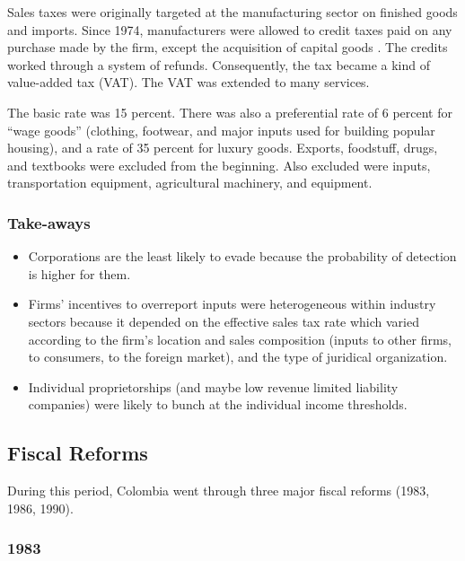 \documentclass[
  12pt]{article}
\providecommand{\tightlist}{%
  \setlength{\itemsep}{0pt}\setlength{\parskip}{0pt}}\usepackage{longtable,booktabs,array}
\begin{document}
Sales taxes were originally targeted at the manufacturing sector on
finished goods and imports. Since 1974, manufacturers were allowed to
credit taxes paid on any purchase made by the firm, except the
acquisition of capital goods \citep{Perry1990}. The credits worked
through a system of refunds. Consequently, the tax became a kind of
value-added tax (VAT). The VAT was extended to many services.

The basic rate was 15 percent. There was also a preferential rate of 6
percent for ``wage goods'' (clothing, footwear, and major inputs used
for building popular housing), and a rate of 35 percent for luxury
goods. Exports, foodstuff, drugs, and textbooks were excluded from the
beginning. Also excluded were inputs, transportation equipment,
agricultural machinery, and equipment.

\hypertarget{take-aways}{%
\subsubsection{Take-aways}\label{take-aways}}

\begin{itemize}
\tightlist
\item
  Corporations are the least likely to evade because the probability of
  detection is higher for them.
\item
  Firms' incentives to overreport inputs were heterogeneous within
  industry sectors because it depended on the effective sales tax rate
  which varied according to the firm's location and sales composition
  (inputs to other firms, to consumers, to the foreign market), and the
  type of juridical organization.
\item
  Individual proprietorships (and maybe low revenue limited liability
  companies) were likely to bunch at the individual income thresholds.
\end{itemize}

\hypertarget{fiscal-reforms}{%
\subsection{Fiscal Reforms}\label{fiscal-reforms}}

During this period, Colombia went through three major fiscal reforms
(1983, 1986, 1990).

\hypertarget{section}{%
\subsubsection{1983}\label{section}}
\end{document}
